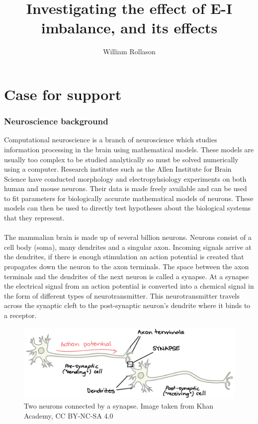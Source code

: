 \documentclass{epsrc}
\begin{document}
\title{Investigating the effect of E-I imbalance, and its effects }
\author{William Rollason}
\maketitle

\part{Case for support}
\section{Neuroscience background}
\noindent
Computational neuroscience is a branch of neuroscience which studies information processing in the brain using mathematical models. These models are usually too complex to be studied analytically so must be solved numerically using a computer. Research institutes such as the Allen Institute for Brain Science have conducted morphology and electropyhsiology experiments on both human and mouse neurons. Their data is made freely available and can be used to fit parameters for biologically accurate mathematical models of neurons. These models can then be used to directly test hypotheses about the biological systems that they represent. 
\\\\
The mammalian brain is made up of several billion neurons. Neurons consist of a cell body (soma), many dendrites and a singular axon. Incoming signals arrive at the dendrites, if there is enough stimulation an action potential is created that propagates down the neuron to the axon terminals. The space between the axon terminals and the dendrites of the next neuron is called a synapse. At a synapse the electrical signal from an action potential is converted into a chemical signal in the form of different types of neurotransmitter. This neurotransmitter travels across the synaptic cleft to the post-synaptic neuron's dendrite where it binds to a receptor.

\begin{figure}[ht]
  \includegraphics[width=0.7\linewidth]{img/Synapse_khan.png}
  \caption{Two neurons connected by a synapse. Image taken from Khan Academy, CC BY-NC-SA 4.0 }
  \label{fig:synapse}
\end{figure}
\end{document}
